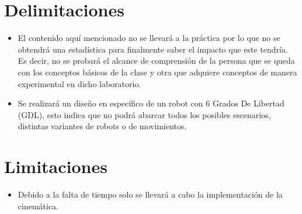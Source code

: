 \section{Delimitaciones}
\begin{itemize}
\item El contenido aquí mencionado no se llevará a la práctica por lo que no se obtendrá una estadística para finalmente saber el impacto que este tendría. Es decir, no se probará el alcance de comprensión de la persona que se queda con los conceptos básicos de la clase y otra que adquiere conceptos de manera experimental en dicho laboratorio.
\item Se realizará un diseño en específico de un robot con 6 Grados De Libertad (GDL), esto indica que no podrá abarcar todos los posibles escenarios, distintas variantes de robots o de movimientos.
\end{itemize}

\section{Limitaciones}
\begin{itemize}
\item Debido a la falta de tiempo solo se llevará a cabo la implementación de la cinemática.
\end{itemize}
